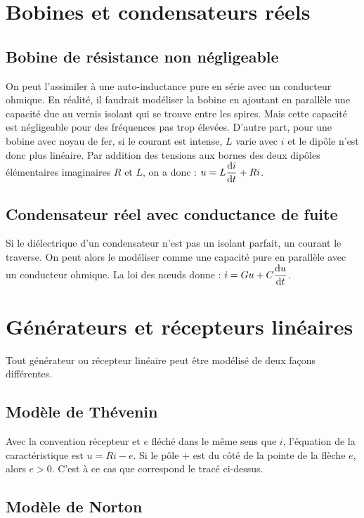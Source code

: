 \section{Bobines et condensateurs réels}

\subsection{Bobine de résistance non négligeable}

On peut l'assimiler à une auto-inductance pure en série avec un conducteur ohmique. En réalité, il faudrait modéliser la bobine en ajoutant en parallèle une capacité due au vernis isolant qui se trouve entre les spires. Mais cette capacité est négligeable pour des fréquences pas trop élevées. D'autre part, pour une bobine avec noyau de fer, si le courant est intense, \(L\) varie avec \(i\) et le dipôle n'est donc plus linéaire. Par addition des tensions aux bornes des deux dipôles élémentaires imaginaires \(R\) et \(L\), on a donc : \(u = L\dfrac{\mathrm{d} i}{\mathrm{d} t} + Ri\).

\subsection{Condensateur réel avec conductance de fuite}

Si le diélectrique d'un condensateur n'est pas un isolant parfait, un courant le traverse. On peut alors le modéliser comme une capacité pure en parallèle avec un conducteur ohmique.
La loi des nœuds donne : \(i = Gu + C \dfrac{\mathrm{d} u}{\mathrm{d} t}\).

\section{Générateurs et récepteurs linéaires}

Tout générateur ou récepteur linéaire peut être modélisé de deux façons différentes.

\subsection{Modèle de Thévenin}

Avec la convention récepteur et \(e\) fléché dans le même sens que \(i\), l'équation de la caractéristique est \(u=Ri-e\). Si le pôle + est du côté de la pointe de la flèche \(e\), alors \(e > 0\). C'est à ce cas que correspond le tracé ci-dessus.

\subsection{Modèle de Norton}

